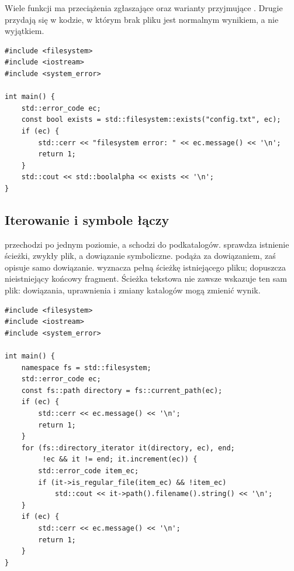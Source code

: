 Wiele funkcji ma przeciążenia zgłaszające
 oraz warianty przyjmujące
. Drugie przydają się w kodzie, w którym brak
pliku jest normalnym wynikiem, a nie wyjątkiem.

\begin{lstlisting}[caption={Kontrolowany odczyt informacji o pliku.}]
#include <filesystem>
#include <iostream>
#include <system_error>

int main() {
    std::error_code ec;
    const bool exists = std::filesystem::exists("config.txt", ec);
    if (ec) {
        std::cerr << "filesystem error: " << ec.message() << '\n';
        return 1;
    }
    std::cout << std::boolalpha << exists << '\n';
}
\end{lstlisting}

\subsection{Iterowanie i symbole łączy}

 przechodzi po jednym poziomie, a
 schodzi do podkatalogów.
 sprawdza istnienie ścieżki, 
zwykły plik, a  dowiązanie symboliczne.
 podąża za dowiązaniem, zaś 
opisuje samo dowiązanie.  wyznacza pełną ścieżkę
istniejącego pliku;  dopuszcza nieistniejący
końcowy fragment. Ścieżka tekstowa nie zawsze wskazuje ten sam plik:
dowiązania, uprawnienia i zmiany katalogów mogą zmienić wynik.

\begin{lstlisting}[caption={Wypisanie zwyklych plikow z katalogu (C++17).}]
#include <filesystem>
#include <iostream>
#include <system_error>

int main() {
    namespace fs = std::filesystem;
    std::error_code ec;
    const fs::path directory = fs::current_path(ec);
    if (ec) {
        std::cerr << ec.message() << '\n';
        return 1;
    }
    for (fs::directory_iterator it(directory, ec), end;
         !ec && it != end; it.increment(ec)) {
        std::error_code item_ec;
        if (it->is_regular_file(item_ec) && !item_ec)
            std::cout << it->path().filename().string() << '\n';
    }
    if (ec) {
        std::cerr << ec.message() << '\n';
        return 1;
    }
}
\end{lstlisting}


